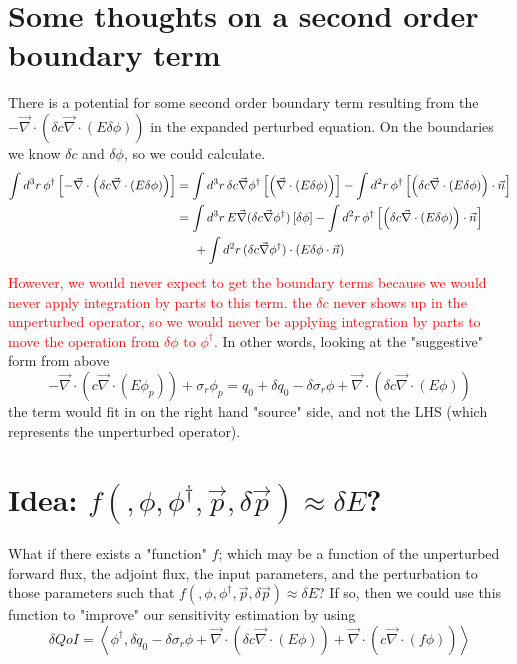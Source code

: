 \documentclass{article}
\newcommand{\bra}{\left\langle}
\newcommand{\ket}{\right\rangle}
\newcommand{\vdiv}{\vec{\nabla} \cdot}
\newcommand{\vgrad}{\vec{\nabla}}
\newcommand{\intrrr}{\int d^3 r \,}
\newcommand{\intrr}{\int d^2 r \,}
\begin{document}
\section{Some thoughts on a second order boundary term}
There is a potential for some second order boundary term resulting from the $- \vdiv \left( \delta c \vdiv \left( E \delta \phi \right) \right)$ in the expanded perturbed equation. On the boundaries we know $\delta c$ and $\delta \phi$, so we could calculate.
\begin{align*}
\intrrr \phi^\dag \left[ - \vdiv \left( \delta c \vdiv \left( E \delta \phi \right) \right) \right] 
&= \intrrr \delta c  \vgrad \phi^\dag \left[  \left( \vdiv \left( E \delta \phi \right) \right) \right]  - \intrr \phi^\dag \left[  \left( \delta c \vdiv \left( E \delta \phi \right) \right) \cdot \vec{n} \right] \\
&= \intrrr E \vgrad (\delta c  \vgrad \phi^\dag) \left[ \delta \phi  \right]  - \intrr \phi^\dag \left[  \left( \delta c \vdiv \left( E \delta \phi \right) \right) \cdot \vec{n} \right] \\
&\hspace{5mm}+\intrr (\delta c  \vgrad \phi^\dag) \cdot (E \delta \phi \cdot \vec{n}) 
\end{align*}
\textcolor{red}{However, we would never expect to get the boundary terms because we would never apply integration by parts to this term. the $\delta c$ never shows up in the unperturbed operator, so we would never be applying integration by parts to move the operation from $\delta \phi$ to $\phi^\dag$.} In other words, looking at the "suggestive" form from above
\[ 
-\vdiv \left( c \vdiv \left( E \phi_p \right) \right) + \sigma_r \phi_p
= q_0 + \delta q_0 - \delta \sigma_r \phi + \vdiv \left( \delta c \vdiv \left( E \phi \right) \right) 
\]
the term would fit in on the right hand "source" side, and not the LHS (which represents the unperturbed operator).




\section{Idea: $f(,\phi,\phi^\dag,\vec{p},\delta\vec{p}) \approx \delta E$?}
What if there exists a "function" $f$; which may be a function of the unperturbed forward flux, the adjoint flux, the input parameters, and the perturbation to those parameters such that $f(,\phi,\phi^\dag,\vec{p},\delta\vec{p}) \approx \delta E$? If so, then we could use this function to "improve" our sensitivity estimation by using
\[
\delta QoI = \bra \phi^\dag , \delta q_0 - \delta \sigma_r \phi + \vdiv \left( \delta c \vdiv \left( E \phi \right) \right) + \vdiv \left( c \vdiv \left( f \phi \right) \right)  \ket
\]
\end{document}
